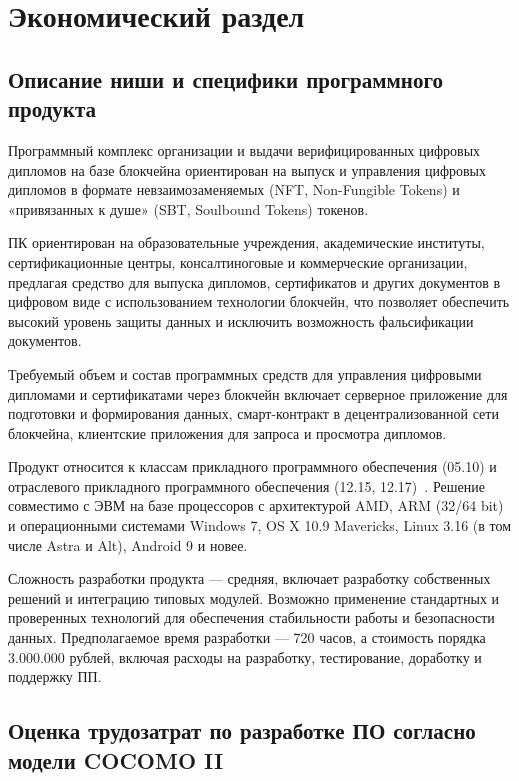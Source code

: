 \section{Экономический раздел}
\label{sec:economy}

\subsection{Описание ниши и специфики программного продукта}

Программный комплекс организации и выдачи верифицированных цифровых дипломов на базе блокчейна ориентирован на выпуск и управления цифровых дипломов в формате невзаимозаменяемых (NFT, Non-Fungible Tokens) и «привязанных к душе» (SBT, Soulbound Tokens) токенов.

ПК ориентирован на образовательные учреждения, академические институты, сертификационные центры, консалтиноговые и коммерческие организации, предлагая средство для выпуска дипломов, сертификатов и других документов в цифровом виде с использованием технологии блокчейн, что позволяет обеспечить высокий уровень защиты данных и исключить возможность фальсификации документов.

Требуемый объем и состав программных средств для управления цифровыми дипломами и сертификатами через блокчейн включает серверное приложение для подготовки и формирования данных, смарт-контракт в децентрализованной сети блокчейна, клиентские приложения для запроса и просмотра дипломов.

Продукт относится к классам прикладного программного обеспечения (05.10) и отраслевого прикладного программного обеспечения (12.15, 12.17)~\cite{bib:reestrpo}. Решение совместимо с ЭВМ на базе процессоров с архитектурой AMD, ARM (32/64 bit) и операционными системами Windows 7, OS X 10.9 Mavericks, Linux 3.16 (в том числе Astra и Alt), Android 9 и новее.

Сложность разработки продукта --- средняя, включает разработку собственных решений и интеграцию типовых модулей. Возможно применение стандартных и проверенных технологий для обеспечения стабильности работы и безопасности данных. Предполагаемое время разработки --- 720 часов, а стоимость порядка 3.000.000 рублей, включая расходы на разработку, тестирование, доработку и поддержку ПП.

\subsection{Оценка трудозатрат по разработке ПО согласно модели COCOMO II}

